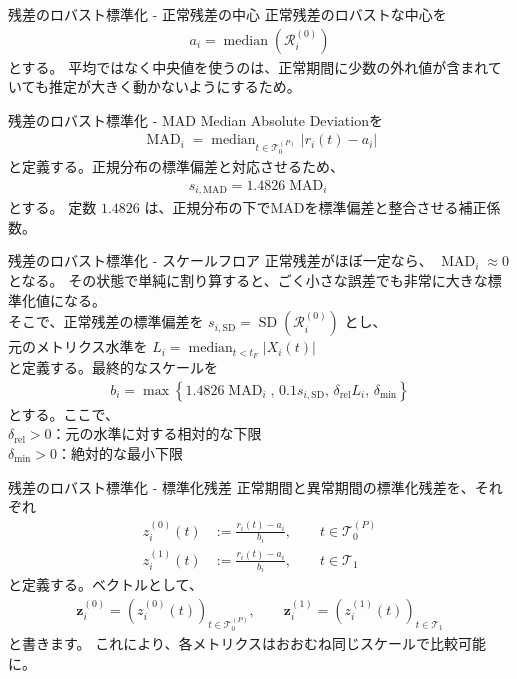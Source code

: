\documentclass[dvipdfmx, 11pt, aspectratio=169, notheorems]{beamer}
\begin{document}
\begin{frame}{残差のロバスト標準化 - 正常残差の中心}
    正常残差のロバストな中心を
\begin{align}
    a_i = \operatorname{median} \left( \mathcal R_i^{(0)} \right)
\end{align}
とする。
平均ではなく中央値を使うのは、正常期間に少数の外れ値が含まれていても推定が大きく動かないようにするため。
\end{frame}

\begin{frame}{残差のロバスト標準化 - MAD}
    Median Absolute Deviationを
    \begin{align}
        \operatorname{MAD}_i = \operatorname{median}_{t\in\mathcal T_0^{(P)}} \left| r_i(t)-a_i \right|
    \end{align}
    と定義する。正規分布の標準偏差と対応させるため、
    \begin{align}
        s_{i,\mathrm{MAD}} = 1.4826\operatorname{MAD}_i
    \end{align}
    とする。 定数 \(1.4826\) は、正規分布の下でMADを標準偏差と整合させる補正係数。
\end{frame}

\begin{frame}{残差のロバスト標準化 - スケールフロア}
    正常残差がほぼ一定なら、
    $ \operatorname{MAD}_i\approx 0 $となる。
    その状態で単純に割り算すると、ごく小さな誤差でも非常に大きな標準化値になる。\\
    そこで、正常残差の標準偏差を
    $ s_{i,\mathrm{SD}} = \operatorname{SD} \left( \mathcal R_i^{(0)} \right)$
    とし、\\
    元のメトリクス水準を
    $ L_i = \operatorname{median}_{t<t_F} |X_i(t)|$ \\
    と定義する。最終的なスケールを
    \begin{align}
        b_i = \max \left\{ 1.4826\operatorname{MAD}_i,\, 0.1s_{i,\mathrm{SD}},\, \delta_{\mathrm{rel}}L_i,\, \delta_{\min}
    \right\}
    \end{align}とする。ここで、\\
    \(\delta_{\mathrm{rel}}>0\)：元の水準に対する相対的な下限\\
    \(\delta_{\min}>0\)：絶対的な最小下限
\end{frame}

\begin{frame}{残差のロバスト標準化 - 標準化残差}
    正常期間と異常期間の標準化残差を、それぞれ
    \begin{align}
        z_i^{(0)}(t) &:= \frac{r_i(t)-a_i}{b_i}, \qquad t\in\mathcal T_0^{(P)} \\
        z_i^{(1)}(t) &:= \frac{r_i(t)-a_i}{b_i}, \qquad t\in\mathcal T_1
    \end{align}
    と定義する。ベクトルとして、
    \begin{align}
        \boldsymbol z_i^{(0)} = \left( z_i^{(0)}(t) \right)_{t\in\mathcal T_0^{(P)}} , \qquad
        \boldsymbol z_i^{(1)} = \left( z_i^{(1)}(t) \right)_{t\in\mathcal T_1}
    \end{align}
    と書きます。
    これにより、各メトリクスはおおむね同じスケールで比較可能に。
\end{frame}
\end{document}
